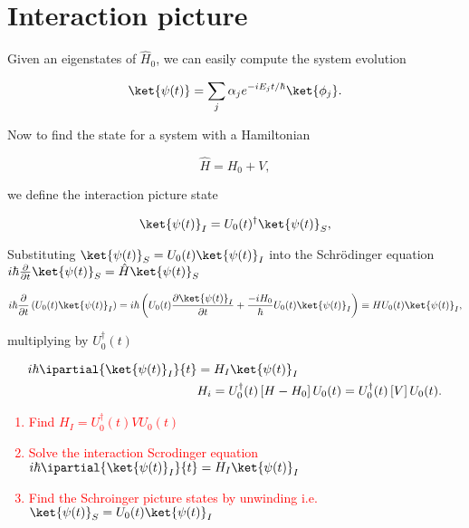 \section{Interaction picture \label{sec:interaction}}
Given an eigenstates of $\hat{H}_0$, we can easily compute the system evolution 

\begin{equation}
\ket{\psi(t)} = \sum_j\alpha_je^{-iE_jt/\hbar}\ket{\phi_j}.
\end{equation} 

Now to find the state for a system with a Hamiltonian 

\begin{equation}
\hat{H} = {H}_0 +V,
\end{equation}

\noindent we define the interaction picture state

\begin{equation}
\ket{\psi(t)}_I = U_0(t)^\dagger\ket{\psi(t)}_S,
\end{equation}

\noindent Substituting $\ket{\psi(t)}_S = U_0(t)\ket{\psi(t)}_I$ into the Schrödinger equation $i\hbar\frac{\partial}{\partial t}\ket{\psi(t)}_S = \hat{H}\ket{\psi(t)}_S$

\begin{equation}
\begin{aligned}
i\hbar\frac{\partial}{\partial t}\left(U_0(t)\ket{\psi(t)}_I\right) = i\hbar\left(U_0(t)\frac{\partial\ket{\psi(t)}_I}{\partial t} + \frac{-iH_0}{\hbar}U_0(t)\ket{\psi(t)}_I\right) \equiv HU_0(t)\ket{\psi(t)}_I,
\end{aligned}
\end{equation}

\noindent multiplying by $U_0^\dagger(t)$

\begin{equation}\label{eqn:interactionPictureHamiltonian}
\begin{aligned}
i\hbar\ipartial{\ket{\psi(t)}_I}{t} & = H_I\ket{\psi(t)}_I\\
& H_i = U_0^\dagger(t)\left[H-H_0\right]U_0(t) = U_0^\dagger(t)\left[V\right]U_0(t).
\end{aligned}
\end{equation}

\textcolor{red}{\begin{enumerate}
		\item Find $H_I = U_0^\dagger(t)VU_0(t)$
		\item Solve the interaction Scrodinger equation $i\hbar\ipartial{\ket{\psi(t)}_I}{t} = H_I\ket{\psi(t)}_I$
		\item Find the Schroinger picture states by unwinding i.e. $\ket{\psi(t)}_S = U_0(t)\ket{\psi(t)}_I$
\end{enumerate}} 

